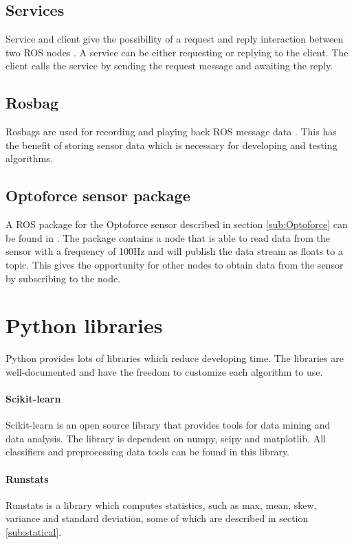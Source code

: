 \documentclass[USenglish]{ifimaster}  %
\begin{document}
\subsection{Services}\label{sub:service}
Service and client give the possibility of a request and reply interaction between two ROS nodes \cite{ROSconcept}. A service can be either requesting or replying to the client. The client calls the service by sending the request message and awaiting the reply.

\subsection{Rosbag}
Rosbags are used for recording and playing back ROS message data \cite{ROSconcept}. This has the benefit of storing sensor data which is necessary for developing and testing algorithms.


\subsection{Optoforce sensor package}  
A ROS package for the Optoforce sensor described in section \ref{sub:Optoforce} can be found in \cite{optoRos}. The package contains a node that is able to read data from the sensor with a frequency of 100Hz and will publish the data stream as floats to a topic. This gives the opportunity for other nodes to obtain data from the sensor by subscribing to the node.

\section{Python libraries}
Python provides lots of libraries which reduce developing time. The libraries are well-documented and have the freedom to customize each algorithm to use.

\paragraph{Scikit-learn} \label{para:scikit}
Scikit-learn \cite{scikit-learn} is an open source library that provides tools for data mining and data analysis. The library is dependent on numpy, scipy and matplotlib. All classifiers and preprocessing data tools can be found in this library. 


\paragraph{Runstats}
Runstats \cite{runstats} is a library which computes statistics, such as max, mean, skew, variance and standard deviation, some of which are described in section \ref{sub:statical}.
\end{document}
